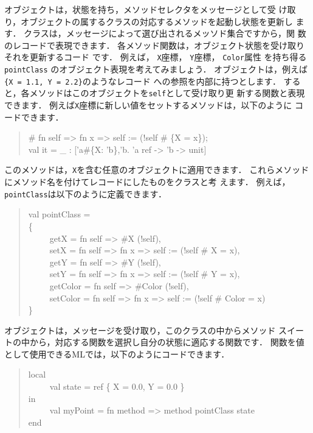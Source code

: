 \documentclass{jbook}
\newcommand{\myem}{\ \ \ \ \  }
\begin{document}
	オブジェクトは，状態を持ち，メソッドセレクタをメッセージとして受
け取り，オブジェクトの属するクラスの対応するメソッドを起動し状態を更新し
ます．
	クラスは，メッセージによって選び出されるメッソド集合ですから，関
数のレコードで表現できます．
	各メソッド関数は，オブジェクト状態を受け取りそれを更新するコード
です．
	例えば，
{\tt X}座標，
{\tt Y}座標，
{\tt Color}属性
を持ち得る
{\tt pointClass}
のオブジェクト表現を考えてみましょう．
	オブジェクトは，例えば{\tt \{X = 1.1, Y = 2.2\}}のようなレコード
への参照を内部に持つとします．
	すると，各メソッドはこのオブジェクトを{\tt self}として受け取り更
新する関数と表現できます．
	例えば{\tt X}座標に新しい値をセットするメソッドは，以下のように
コードできます．
\begin{tt}
\begin{quote}
\# fn self => fn x => self := (!self \# \{X = x\});\\
val it = \_ : ['a\#\{X: 'b\},'b. 'a ref -> 'b -> unit]
\end{quote}
\end{tt}
	このメソッドは，{\tt X}を含む任意のオブジェクトに適用できます．
	これらメソッドにメソッド名を付けてレコードにしたものをクラスと考
えます．
	例えば，{\tt pointClass}は以下のように定義できます．
\begin{tt}
\begin{quote}
val pointClass =\\
\{\\
\myem  getX = fn self => \#X (!self),\\
\myem  setX = fn self => fn x => self := (!self \# {X = x}),\\
\myem  getY = fn self => \#Y (!self),\\
\myem  setY = fn self => fn x => self := (!self \# {Y = x}),\\
\myem  getColor = fn self => \#Color (!self),\\
\myem  setColor = fn self => fn x => self := (!self \# {Color = x})\\
\}
\end{quote}
\end{tt}
	オブジェクトは，メッセージを受け取り，このクラスの中からメソッド
スイートの中から，対応する関数を選択し自分の状態に適応する関数です．
	関数を値として使用できるMLでは，以下のようにコードできます．
\begin{tt}
\begin{quote}
local\\
\myem  val state =  ref \{ X = 0.0, Y = 0.0 \}\\
in \\
\myem val myPoint = fn method => method pointClass state\\
end
\end{quote}
\end{tt}
\end{document}
